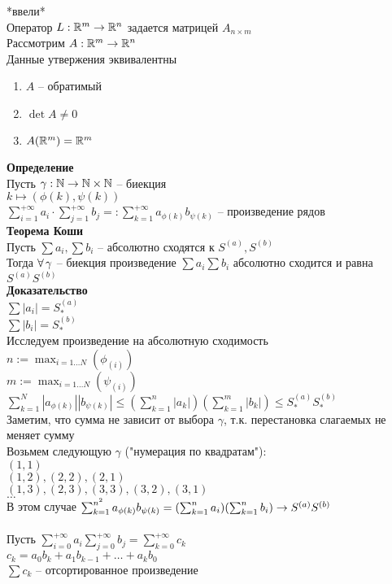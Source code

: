 \documentclass[12pt]{article}
\begin{document}
*ввели*\\
Оператор $L: \mathbb{R}^m \rightarrow \mathbb{R}^n$ задается матрицей $A_{n\times m}$\\
Рассмотрим $A: \mathbb{R}^m \rightarrow \mathbb{R}^n$\\
Данные утвержения эквивалентны
\begin{enumerate}
    \item $A$ -- обратимый
    \item $\det A\neq 0$
    \item $A(\mathbb{R}^m) = \mathbb{R}^m$
\end{enumerate}
\textbf{Определение}\\
Пусть $\gamma: \mathbb{N} \rightarrow \mathbb{N} \times \mathbb{N}$ -- биекция\\
$k \mapsto (\phi(k), \psi(k))$\\
$\sum_{i=1}^{+\infty} a_i \cdot \sum_{j=1}^{+\infty} b_j =: \sum_{k=1}^{+\infty} a_{\phi(k)}b_{\psi(k)}$ -- произведение рядов\\
\textbf{Теорема Коши}\\
Пусть $\sum a_i, \sum b_i$ -- абсолютно сходятся к $S^{(a)}, S^{(b)}$\\
Тогда $\forall\, \gamma$ -- биекция произведение $\sum a_i \sum b_i$ абсолютно сходится и равна $S^{(a)}S^{(b)}$\\
\textbf{Доказательство}\\
$\sum |a_i| = S^{(a)}_*$\\
$\sum |b_i| = S^{(b)}_*$\\
Исследуем произведение на абсолютную сходимость\\
$n:= \max_{i = 1\ldots N}(\phi_(i))$\\
$m:= \max_{i = 1\ldots N}(\psi_(i))$\\
$\sum_{k=1}^N |a_{\phi(k)}||b_{\psi(k)}| \leq (\sum_{k=1}^n |a_k|)(\sum_{k=1}^m |b_k|) \leq S_*^{(a)}S_*^{(b)}$\\
Заметим, что сумма не зависит от выбора $\gamma$, т.к. перестановка слагаемых не меняет сумму\\
Возьмем следующую $\gamma$ ("нумерация по квадратам"):\\
$(1, 1)$\\
$(1, 2), (2, 2), (2, 1)$\\
$(1, 3), (2, 3), (3, 3), (3, 2), (3,1)$\\
$\ldots$\\
В этом случае $\sum_{k=1}^{n^2} a_{\phi(k)}b_{\psi(k)} = (\sum_{k=1}^n a_i)(\sum_{k=1}^n b_i) \rightarrow S^{(a)}S^{(b)}$\\\\
Пусть $\sum_{i=0}^{+\infty} a_i \sum_{j=0}^{+\infty} b_j = \sum_{k=0}^{+\infty} c_k$\\
$c_k = a_0b_k + a_1b_{k-1} + \ldots + a_kb_0$\\
$\sum c_k$ -- отсортированное произведение\\
\end{document}
